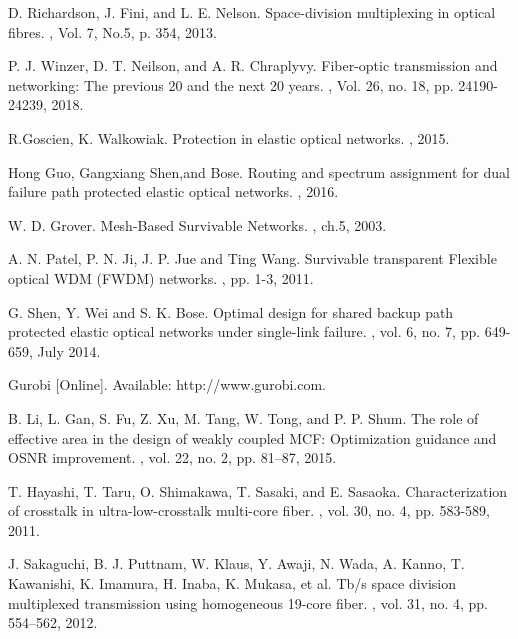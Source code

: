 \documentclass[a4paper,11pt]{report}
\begin{document}
\begin{thebibliography}{1}


D. Richardson, J. Fini, and L. E. Nelson.
\newblock Space-division multiplexing in optical fibres.
, Vol. 7, No.5, p. 354, 2013.

P. J. Winzer, D. T. Neilson, and A. R. Chraplyvy.
\newblock Fiber-optic transmission and networking: The previous 20 and the next 20 years.
, Vol. 26, no. 18, pp. 24190-24239, 2018.

R.Goscien, K. Walkowiak.
\newblock Protection in elastic optical networks.
, 2015.

Hong Guo, Gangxiang Shen,and Bose.
\newblock Routing and spectrum assignment for dual failure path protected elastic optical networks.
, 2016.


W. D. Grover.
\newblock Mesh-Based Survivable Networks.
, ch.5, 2003.

A. N. Patel, P. N. Ji, J. P. Jue and Ting Wang.
\newblock Survivable transparent Flexible optical WDM (FWDM) networks.
, pp. 1-3, 2011.

G. Shen, Y. Wei and S. K. Bose.
\newblock Optimal design for shared backup path protected elastic optical networks under single-link failure.
, vol. 6, no. 7, pp. 649-659, July 2014.



Gurobi [Online]. Available: http://www.gurobi.com.
\newblock 
\newblock {\em }



B. Li, L. Gan, S. Fu, Z. Xu, M. Tang, W. Tong, and P. P. Shum.
\newblock The role of effective area in the design of weakly coupled MCF: Optimization guidance and OSNR improvement.
, vol. 22, no. 2, pp. 81–87, 2015.

T. Hayashi, T. Taru, O. Shimakawa, T. Sasaki, and E. Sasaoka.
\newblock Characterization of crosstalk in ultra-low-crosstalk multi-core fiber.
, vol. 30, no. 4, pp. 583-589, 2011.

J. Sakaguchi, B. J. Puttnam, W. Klaus, Y. Awaji, N. Wada, A. Kanno, T. Kawanishi, K. Imamura, H. Inaba, K. Mukasa, et al.
 Tb/s space division multiplexed transmission using homogeneous 19-core fiber.
, vol. 31, no. 4, pp. 554–562, 2012.


\end{thebibliography}
\end{document}

